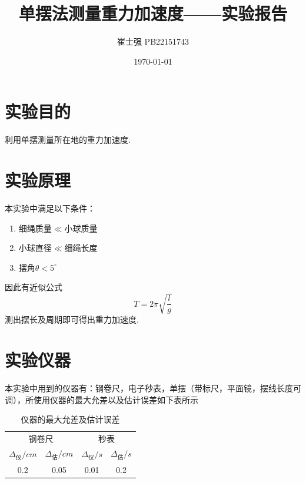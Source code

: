 \documentclass[UTF8]{ctexart}
\title{单摆法测量重力加速度——实验报告}
\author{崔士强 PB22151743}
\date{\today}
\begin{document}
\maketitle
\section{实验目的}
利用单摆测量所在地的重力加速度.
\section{实验原理}
\noindent 本实验中满足以下条件：
\begin{enumerate}
    \item 细绳质量$\ll$小球质量
    \item 小球直径$\ll$细绳长度
    \item 摆角$\theta <5^\circ$
\end{enumerate}
因此有近似公式
\[T=2\pi\sqrt{\frac{l}{g}}\]
测出摆长及周期即可得出重力加速度.
\section{实验仪器}
本实验中用到的仪器有：钢卷尺，电子秒表，单摆（带标尺，平面镜，摆线长度可调），所使用仪器的最大允差以及估计误差如下表所示
\begin{table}[H]\centering
    \begin{tabular}{cccc}
        \hline\hline
        \multicolumn{2}{c}{钢卷尺}&\multicolumn{2}{c}{秒表}\\
        $\Delta_\text{仪}/cm$ & $\Delta_\text{估}/cm$ & $\Delta_\text{仪}/s$ & $\Delta_\text{估}/s$ \\
        \hline
        0.2&0.05&0.01&0.2\\
        \hline\hline
    \end{tabular}
    \caption{仪器的最大允差及估计误差}
\end{table}
\clearpage
\end{document}
